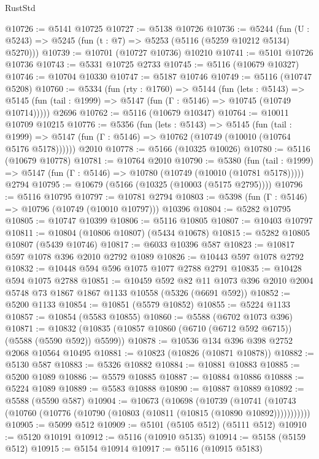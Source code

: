 \begin{lexlean}{RustStd}
\begin{coremodule}
@10726 := @5141 @10725
@10727 := @5138 @10726
@10736 := @5244
    (fun (U : @5243) => @5245 (fun (t : @7) => @5253 (@5116 (@5259 @10212 @5134) @5270)))
@10739 := @10701 (@10727 @10736) @10210
@10741 := @5101 @10726 @10736
@10743 := @5331 @10725 @2733
@10745 := @5116 (@10679 @10327)
@10746 := @10704 @10330
@10747 := @5187 @10746
@10749 := @5116 (@10747 @5208)
@10760 := @5334
    (fun (rty : @1760) =>
    @5144
      (fun (lets : @5143) =>
      @5145 (fun (tail : @1999) => @5147 (fun (Γ : @5146) => @10745 (@10749 @10714)))))
    @2696
@10762 := @5116 (@10679 @10347)
@10764 := @10011 @10709 @10215
@10776 := @5356
    (fun (lets : @5143) =>
    @5145
      (fun (tail : @1999) =>
      @5147 (fun (Γ : @5146) => @10762 (@10749 (@10010 (@10764 @5176 @5178))))))
    @2010
@10778 := @5166 (@10325 @10026)
@10780 := @5116 (@10679 @10778)
@10781 := @10764 @2010
@10790 := @5380
    (fun (tail : @1999) => @5147 (fun (Γ : @5146) => @10780 (@10749 (@10010 (@10781 @5178)))))
    @2794
@10795 := @10679 (@5166 (@10325 (@10003 (@5175 @2795))))
@10796 := @5116 @10795
@10797 := @10781 @2794
@10803 := @5398 (fun (Γ : @5146) => @10796 (@10749 (@10010 @10797))) @10396
@10804 := @5282 @10795
@10805 := @10747 @10399
@10806 := @5116 @10805
@10807 := @10403 @10797
@10811 := @10804 (@10806 @10807) (@5434 @10678)
@10815 := @5282 @10805 @10807 (@5439 @10746)
@10817 := @6033 @10396 @587
@10823 := @10817 @597 @1078 @396 @2010 @2792 @1089
@10826 := @10443 @597 @1078 @2792
@10832 := @10448 @594 @596 @1075 @1077 @2788 @2791
@10835 := @10428 @594 @1075 @2788
@10851 := @10459
    @592
    @82
    @11
    @1073
    @396
    @2010
    @2004
    @5748
    @73
    @1867
    @1867
    @1133
    @10558
    (@5326 (@6691 @592))
@10852 := @5200 @1133
@10854 := @10851 (@5579 @10852)
@10855 := @5224 @1133
@10857 := @10854 (@5583 @10855)
@10860 := @5588 (@6702 @1073 @396)
@10871 := @10832 (@10835 (@10857 @10860 (@6710 (@6712 @592 @6715)) (@5588 (@5590 @592)) @5599))
@10878 := @10536 @134 @396 @398 @2752 @2068 @10564 @10495
@10881 := @10823 (@10826 (@10871 @10878))
@10882 := @5130 @587
@10883 := @5326 @10882
@10884 := @10881 @10883
@10885 := @5200 @1089
@10886 := @5579 @10885
@10887 := @10884 @10886
@10888 := @5224 @1089
@10889 := @5583 @10888
@10890 := @10887 @10889
@10892 := @5588 (@5590 @587)
@10904 := @10673
    (@10698
      (@10739
        (@10741 (@10743 (@10760 (@10776 (@10790 (@10803 (@10811 (@10815 (@10890 @10892)))))))))))
@10905 := @5099 @512
@10909 := @5101 (@5105 @512) (@5111 @512)
@10910 := @5120 @10191
@10912 := @5116 (@10910 @5135)
@10914 := @5158 (@5159 @512)
@10915 := @5154 @10914
@10917 := @5116 (@10915 @5183)

\end{coremodule}
\end{lexlean}

